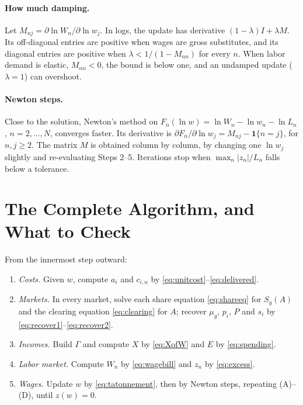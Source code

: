 \documentclass[11pt]{article}
\begin{document}
\paragraph{How much damping.} Let $M_{nj}=\partial\ln W_n/\partial\ln w_j$. In logs, the
update has derivative $(1-\lambda)I+\lambda M$. Its off-diagonal entries are positive
when wages are gross substitutes, and its diagonal entries are positive when
$\lambda<1/(1-M_{nn})$ for every $n$. When labor demand is elastic, $M_{nn}<0$, the bound
is below one, and an undamped update ($\lambda=1$) can overshoot.

\paragraph{Newton steps.} Close to the solution, Newton's method on
$F_n(\ln w)=\ln W_n-\ln w_n-\ln L_n$, $n=2,\dots,N$, converges faster. Its derivative is
$\partial F_n/\partial\ln w_j=M_{nj}-\mathbf 1\{n=j\}$, for $n,j\ge2$. The matrix $M$ is
obtained column by column, by changing one $\ln w_j$ slightly and re-evaluating Steps
2--5. Iterations stop when $\max_n|z_n|/L_n$ falls below a tolerance.

\section{The Complete Algorithm, and What to Check}
\label{sec:summary}

From the innermost step outward:
\begin{enumerate}[label=(\Alph*)]
\item \emph{Costs.} Given $w$, compute $a_i$ and $c_{i,n}$ by
\eqref{eq:unitcost}--\eqref{eq:delivered}.
\item \emph{Markets.} In every market, solve each share equation \eqref{eq:shareeq} for
$S_g(A)$ and the clearing equation \eqref{eq:clearing} for $A$; recover $\mu_g$, $p_i$,
$P$ and $s_i$ by \eqref{eq:recover1}--\eqref{eq:recover2}.
\item \emph{Incomes.} Build $\Gamma$ and compute $X$ by \eqref{eq:XofW} and $E$ by
\eqref{eq:spending}.
\item \emph{Labor market.} Compute $W_n$ by \eqref{eq:wagebill} and $z_n$ by
\eqref{eq:excess}.
\item \emph{Wages.} Update $w$ by \eqref{eq:tatonnement}, then by Newton steps,
repeating (A)--(D), until $z(w)=0$.
\end{enumerate}
\end{document}
